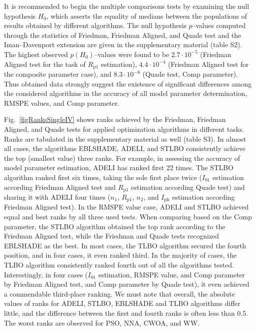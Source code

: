 \documentclass[a4paper,fleqn]{cas-sc}
\begin{document}
It is recommended \cite{Derrac2011} to begin the multiple comparisons tests by examining the null hypothesis $H_0$,
which asserts the equality of medians between the populations of results obtained by different algorithms.
The null hypothesis $p$--values computed through the statistics of  Friedman, Friedman Aligned, and Quade test
and the Iman–Davenport extension
are given in the supplementary material (table S2).
The highest observed $p(H_0)$--values were found to be $2.7\cdot10^{-5}$ (Friedman Aligned test for the task of $R_\mathrm{p1}$ estimation),
$4.4\cdot10^{-4}$ (Friedman Aligned test for the composite parameter case),
and $8.3\cdot10^{-6}$ (Quade test, Comp parameter).
Thus obtained data strongly suggest the existence of significant differences
among the considered algorithms in the accuracy of all model parameter determination, RMSPE values, and Comp parameter.



Fig.~\ref{figRanksSingleIV} shows
ranks achieved by the Friedman, Friedman Aligned, and Quade tests for applied optimization algorithms in different tasks.
Ranks are tabulated in the supplementary material as well (table S3).
In almost all cases, the algorithms EBLSHADE, ADELI, and STLBO consistently achieve the top (smallest value) three ranks.
For example, in assessing the accuracy of model parameter estimation, ADELI has ranked first 22 times.
The STLBO algorithm ranked first six times,
taking the sole first place twice ($I_{01}$ estimation according Friedman Aligned test and
$R_\mathrm{p1}$ estimation according Quade test)
and sharing it with ADELI four times ($n_1$, $R_\mathrm{p1}$, $n_2$, and $I_\mathrm{ph}$ estimation according Friedman Aligned test).
In the RMSPE value case, ADELI and STLBO achieved equal and best ranks by all three used tests.
When comparing based on the Comp parameter,
the STLBO algorithm obtained the top rank according to the Friedman Aligned test,
while the Friedman and Quade tests recognized EBLSHADE as the best.
In most cases, the TLBO algorithm secured the fourth position, and in four cases, it even ranked third.
In the majority of cases, the TLBO algorithm consistently ranked fourth out of all the algorithms tested.
Interestingly, in four cases ($I_{01}$ estimation, RMSPE value, and Comp parameter by Friedman Aligned test,
and Comp parameter by Quade test),
it even achieved a commendable third-place ranking.
We must note that overall, the absolute values of ranks for ADELI, STLBO, EBLSHADE and TLBO algorithms differ little,
and the difference between the first and fourth ranks is often less than 0.5.
The worst ranks are observed for PSO, NNA, CWOA, and WW.
\end{document}
